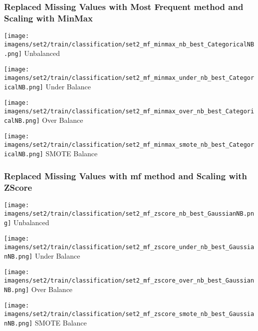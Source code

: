 \documentclass[11pt]{article}
\begin{document}
\subsubsection*{Replaced Missing Values with Most Frequent method and Scaling with MinMax}

\begin{figure*}[!htp]
    \begin{minipage}[!htp]{.25\textwidth}
        \centering
        \texttt{[image: imagens/set2/train/classification/set2\_mf\_minmax\_nb\_best\_CategoricalNB.png]}
        Unbalanced
    \end{minipage}\hfill
    \begin{minipage}[!htp]{.25\textwidth}
        \centering
        \texttt{[image: imagens/set2/train/classification/set2\_mf\_minmax\_under\_nb\_best\_CategoricalNB.png]}
        Under Balance
    \end{minipage}\hfill
    \begin{minipage}[!htp]{.25\textwidth}
        \centering
        \texttt{[image: imagens/set2/train/classification/set2\_mf\_minmax\_over\_nb\_best\_CategoricalNB.png]}
        Over Balance
    \end{minipage}\hfill
    \begin{minipage}[!htp]{.25\textwidth}
        \centering
        \texttt{[image: imagens/set2/train/classification/set2\_mf\_minmax\_smote\_nb\_best\_CategoricalNB.png]}
        SMOTE Balance
    \end{minipage}
\end{figure*}

\subsubsection*{Replaced Missing Values with mf method and Scaling with ZScore}

\begin{figure*}[!htp]
    \begin{minipage}[!htp]{.25\textwidth}
        \centering
        \texttt{[image: imagens/set2/train/classification/set2\_mf\_zscore\_nb\_best\_GaussianNB.png]}
        Unbalanced
    \end{minipage}\hfill
    \begin{minipage}[!htp]{.25\textwidth}
        \centering
        \texttt{[image: imagens/set2/train/classification/set2\_mf\_zscore\_under\_nb\_best\_GaussianNB.png]}
        Under Balance
    \end{minipage}\hfill
    \begin{minipage}[!htp]{.25\textwidth}
        \centering
        \texttt{[image: imagens/set2/train/classification/set2\_mf\_zscore\_over\_nb\_best\_GaussianNB.png]}
        Over Balance
    \end{minipage}\hfill
    \begin{minipage}[!htp]{.25\textwidth}
        \centering
        \texttt{[image: imagens/set2/train/classification/set2\_mf\_zscore\_smote\_nb\_best\_GaussianNB.png]}
        SMOTE Balance
    \end{minipage}
\end{figure*}
\end{document}
